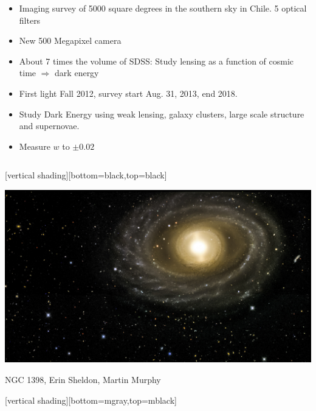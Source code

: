 \documentclass{beamer}
\begin{document}
{\begin{columns}
\begin{column}{0.6\textwidth}
\begin{itemize}
                \item Imaging survey of 5000 square degrees in the southern
                    sky in Chile.  5 optical filters

                \item New 500 Megapixel camera

                \item About 7 times the volume of SDSS: Study lensing as a
                    function of {\color{gold}cosmic time $\Rightarrow$ dark
                    energy}

                \item First light Fall 2012, survey start Aug. 31, 2013, end 2018.

                \item Study Dark Energy using weak lensing, galaxy clusters,
                    large scale structure and supernovae.

                \item Measure {\color{gold} $w$} to {\color{gold} $\pm 0.02$}

            \end{itemize}

        \end{column}

    \end{columns}

}

{
    [vertical shading][bottom=black,top=black]
	
    \frame
    {

        \begin{center}
            \includegraphics[width=1.1\textwidth]{DES-2013-01-medres.jpg}

            {\tiny \hfill NGC 1398, Erin Sheldon, Martin Murphy}
        \end{center}
    }

    [vertical shading][bottom=mgray,top=mblack]

}
\end{document}

